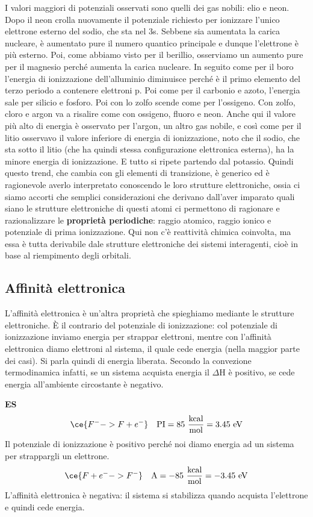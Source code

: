 I valori maggiori di potenziali osservati sono quelli dei gas nobili: elio e neon. Dopo il neon crolla nuovamente il potenziale richiesto per ionizzare l'unico elettrone esterno del sodio, che sta nel 3s. Sebbene sia aumentata la carica nucleare, è aumentato pure il numero quantico principale e dunque l'elettrone è più esterno. Poi, come abbiamo visto per il berillio, osserviamo un aumento pure per il magnesio perché aumenta la carica nucleare. In seguito come per il boro l'energia di ionizzazione dell'alluminio diminuisce perché è il primo elemento del terzo periodo a contenere elettroni p. Poi come per il carbonio e azoto, l'energia sale per silicio e fosforo. Poi con lo zolfo scende come per l'ossigeno. Con zolfo, cloro e argon va a risalire come con ossigeno, fluoro e neon. Anche qui il valore più alto di energia è osservato per l'argon, un altro gas nobile, e così come per il litio osservavo il valore inferiore di energia di ionizzazione, noto che il sodio, che sta sotto il litio (che ha quindi stessa configurazione elettronica esterna), ha la minore energia di ionizzazione. E tutto si ripete partendo dal potassio.
Quindi questo trend, che cambia con gli elementi di transizione, è generico ed è ragionevole averlo interpretato conoscendo le loro strutture elettroniche, ossia ci siamo accorti che semplici considerazioni che derivano dall'aver imparato quali siano le strutture elettroniche di questi atomi ci permettono di ragionare e razionalizzare le \textbf{proprietà periodiche}: raggio atomico, raggio ionico e potenziale di prima ionizzazione. 
Qui non c'è reattività chimica coinvolta, ma essa è tutta derivabile dale strutture elettroniche dei sistemi interagenti, cioè in base al riempimento degli orbitali.
\subsection{Affinità elettronica}
L'affinità elettronica è un'altra proprietà che spieghiamo mediante le strutture elettroniche. È il contrario del potenziale di ionizzazione: col potenziale di ionizzazione inviamo energia per strappar elettroni, mentre con l'affinità elettronica diamo elettroni al sistema, il quale cede energia (nella maggior parte dei casi). Si parla quindi di energia liberata. Secondo la convezione termodinamica infatti, se un sistema acquista energia il $\Delta$H è positivo, se cede energia all'ambiente circostante è negativo. 

\textbf{ES}
$$\ce{ F^- -> F + e^-}\quad \text{PI} = 85\,\,\frac{\text{kcal}}{\text{mol}}=3.45 \text{ eV}$$
Il potenziale di ionizzazione è positivo perché noi diamo energia ad un sistema per strappargli un elettrone.
$$\ce{ F + e^- -> F^-}\quad \text{A} =-85\,\,\frac{\text{kcal}}{\text{mol}}=-3.45 \text{ eV}$$
L'affinità elettronica è negativa: il sistema si stabilizza quando acquista l'elettrone e quindi cede energia.

